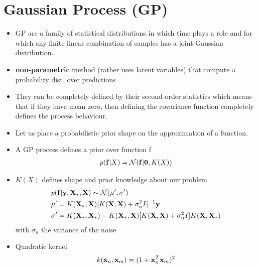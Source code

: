 \section{Gaussian Process (GP)}
\begin{itemize}
    \item GP are a family of statistical distributions in which time plays a role and for which any finite linear combination of samples has a joint Gaussian distribution.
    \item \textbf{non-parametric} method (rather uses latent variables) that compute a probability dist. over predictions
    \item They can be completely defined by their second-order statistics which means that if they have mean zero, then defining the covariance function completely defines the process behaviour.
    \item Let us place a probabilistic prior shape on the approximation of a function.
    \item A GP process defines a prior over function f
    \begin{align*}
        p(\mathbf{f} | X) = \mathcal{N}(\mathbf{f} | \mathbf{0}, K(X))
    \end{align*}
    \item $K(X)$ defines shape and prior knowledge about our problem
    \begin{align*}
        &p(\mathbf{f} | \mathbf{y}, \mathbf{X}_*, \mathbf{X}) \sim \mathcal{N}(\mu', \sigma')\\
        & \mu' = K(\mathbf{X}_*, \mathbf{X})[K(\mathbf{X},\mathbf{X}) + \sigma_n^2 I]^{-1}\mathbf{y}\\
        & \mathbf{\sigma}' = K(\mathbf{X}_*, \mathbf{X}_*) - K(\mathbf{X}_*, \mathbf{X})[K(\mathbf{X}, \mathbf{X}) + \sigma_n^2 I] K(\mathbf{X}, \mathbf{X}_*)
    \end{align*}
    with $\sigma_n$ the variance of the noise
     \item Quadratic kernel 
     \begin{align*}
         k(\mathbf{x}_n, \mathbf{x}_m) = (1 + \mathbf{x}_n^T \mathbf{x}_m)^2
     \end{align*}
\end{itemize}

